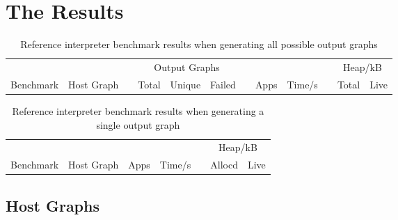 \section{The Results}\label{the-results}



\begin{table}[h]
\begin{minipage}{\textwidth}
\centering

\begin{tabular}{llcrrrcrrcrr}
\hline 
&  && \multicolumn{3}{c}{Output Graphs} && & && \multicolumn{2}{c}{Heap/kB}\\
Benchmark          & Host Graph\footnotemark & & Total & Unique   & Failed & & Apps & Time/s   & & Total  & Live \\
\hline 

\end{tabular}

\caption[Reference interpreter benchmarks]{Reference interpreter benchmark results when generating all possible output graphs}

\label{table:resultsAll}
\end{minipage}
\end{table}




\begin{table}[h]
\begin{minipage}{\textwidth}
\centering

\begin{tabular}{llrrcrr}
\hline 
&  & & & & \multicolumn{2}{c}{Heap/kB}\\
Benchmark          & Host Graph\footnotemark & Apps & Time/s   & & Allocd & Live \\
\hline 

\end{tabular}

\caption[Reference interpreter benchmarks]{Reference interpreter benchmark results when generating a single output graph}

\label{table:resultsSingle}
\end{minipage}
\end{table}




\subsection{Host Graphs}
\label{subsec:hosts}

